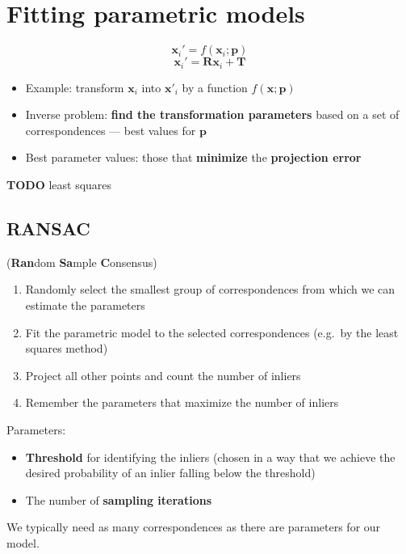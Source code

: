 \documentclass{article}
\begin{document}
    \newpage

\section{Fitting parametric models}
\[ \mathbf{x}_i' = f(\mathbf{x}_i ; \mathbf{p}) \]
\[ \mathbf{x}_i' = \mathbf{R} \mathbf{x}_i + \mathbf{T} \]

\begin{itemize}
    \item Example: transform $\mathbf{x}_i$ into $\mathbf{x'}_i$ by a function $f(\mathbf{x;p})$
    \item Inverse problem: \textbf{find the transformation parameters} based on a set of correspondences --- best values for $\mathbf{p}$
    \item Best parameter values: those that \textbf{minimize} the \textbf{projection error}
\end{itemize}

\textbf{TODO} least squares

    \subsection{RANSAC}
    (\textbf{Ran}dom \textbf{Sa}mple \textbf{C}onsensus)
    \begin{enumerate}
        \item Randomly select the smallest group of correspondences from which we can estimate the parameters
        \item Fit the parametric model to the selected correspondences (e.g.\ by the least squares method)
        \item Project all other points and count the number of inliers
        \item Remember the parameters that maximize the number of inliers
    \end{enumerate}

    \noindent Parameters:
    \begin{itemize}
        \item \textbf{Threshold} for identifying the inliers (chosen in a way that we achieve the desired probability of an inlier falling below the threshold)
        \item The number of \textbf{sampling iterations}
    \end{itemize}
    We typically need as many correspondences as there are parameters for our model. \\
\end{document}
